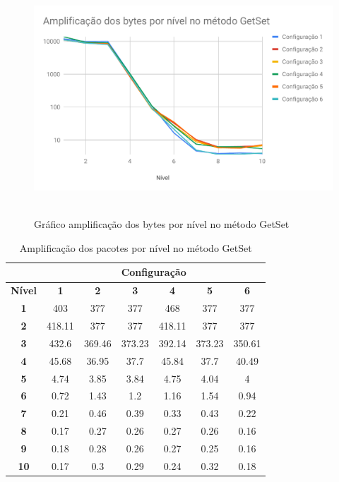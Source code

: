 \begin{figure}[H]
     \centering
     \includegraphics[scale=0.7]{img/AmppGetSet.pdf}\
     \caption{Gráfico amplificação dos bytes por nível no método GetSet}
     \label{img:GSB1}
\end{figure}

\begin{table}[H]
\centering
\caption{Amplificação dos pacotes por nível no método GetSet}
\label{tab:AmpPacGetSet}
\begin{tabular}{|c|c|c|c|c|c|c|}
\hline
               & \multicolumn{6}{c|}{\textbf{Configuração}}                                  \\ \hline
\textbf{Nível} & \textbf{1} & \textbf{2} & \textbf{3} & \textbf{4} & \textbf{5} & \textbf{6} \\ \hline
\textbf{1}     & 403        & 377        & 377        & 468        & 377        & 377        \\ \hline
\textbf{2}     & 418.11     & 377        & 377        & 418.11     & 377        & 377        \\ \hline
\textbf{3}     & 432.6      & 369.46     & 373.23     & 392.14     & 373.23     & 350.61     \\ \hline
\textbf{4}     & 45.68      & 36.95      & 37.7       & 45.84      & 37.7       & 40.49      \\ \hline
\textbf{5}     & 4.74       & 3.85       & 3.84       & 4.75       & 4.04       & 4          \\ \hline
\textbf{6}     & 0.72       & 1.43       & 1.2        & 1.16       & 1.54       & 0.94       \\ \hline
\textbf{7}     & 0.21       & 0.46       & 0.39       & 0.33       & 0.43       & 0.22       \\ \hline
\textbf{8}     & 0.17       & 0.27       & 0.26       & 0.27       & 0.26       & 0.16       \\ \hline
\textbf{9}     & 0.18       & 0.28       & 0.26       & 0.27       & 0.25       & 0.16       \\ \hline
\textbf{10}    & 0.17       & 0.3        & 0.29       & 0.24       & 0.32       & 0.18       \\ \hline
\end{tabular}
\end{table}

